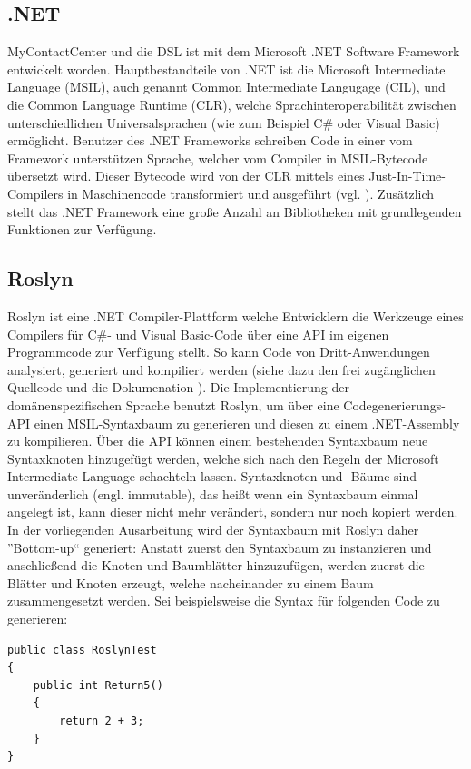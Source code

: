 \subsection{.NET}
MyContactCenter und die DSL ist mit dem Microsoft .NET Software Framework entwickelt worden. Hauptbestandteile von .NET ist die Microsoft Intermediate Language (MSIL), auch genannt Common Intermediate Langugage (CIL), und die Common Language Runtime (CLR), welche Sprachinteroperabilität zwischen unterschiedlichen Universalsprachen (wie zum Beispiel C\# oder Visual Basic) ermöglicht. Benutzer des .NET Frameworks schreiben Code in einer vom Framework unterstützen Sprache, welcher vom Compiler in MSIL-Bytecode übersetzt wird. Dieser Bytecode wird von der CLR mittels eines Just-In-Time-Compilers in Maschinencode transformiert und ausgeführt (vgl. \cite[S. 16ff]{Platt:03}). Zusätzlich stellt das .NET Framework eine große Anzahl an Bibliotheken mit grundlegenden Funktionen zur Verfügung. 

\subsection{Roslyn}
Roslyn ist eine .NET Compiler-Plattform welche Entwicklern die Werkzeuge eines Compilers für C\#- und Visual Basic-Code über eine API im eigenen Programmcode zur Verfügung stellt. So kann Code von Dritt-Anwendungen analysiert, generiert und kompiliert werden (siehe dazu den frei zugänglichen Quellcode und die Dokumenation \cite{Roslyn}). Die Implementierung der domänenspezifischen Sprache benutzt Roslyn, um über eine Codegenerierungs-API einen MSIL-Syntaxbaum zu generieren und diesen zu einem .NET-Assembly zu kompilieren. Über die API können einem bestehenden Syntaxbaum neue Syntaxknoten hinzugefügt werden, welche sich nach den Regeln der Microsoft Intermediate Language schachteln lassen. Syntaxknoten und -Bäume sind unveränderlich (engl. immutable), das heißt wenn ein Syntaxbaum einmal angelegt ist, kann dieser nicht mehr verändert, sondern nur noch kopiert werden. In der vorliegenden Ausarbeitung wird der Syntaxbaum mit Roslyn daher ''Bottom-up`` generiert: Anstatt zuerst den Syntaxbaum zu instanzieren und anschließend die Knoten und Baumblätter hinzuzufügen, werden zuerst die Blätter und Knoten erzeugt, welche nacheinander zu einem Baum zusammengesetzt werden. 
\newline
Sei beispielsweise die Syntax für folgenden Code zu generieren:
\newline
\vspace{1cm}
\noindent
\begin{minipage}{1.0\textwidth} \small
\begin{lstlisting}
public class RoslynTest
{
    public int Return5()
    {
        return 2 + 3;
    }
}
\end{lstlisting}
\end{minipage}

